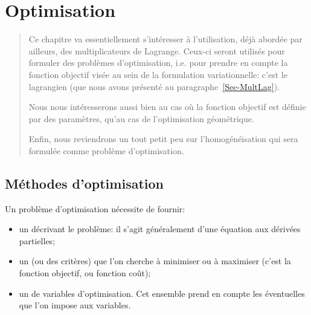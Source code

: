 \chapter{Optimisation}\label{Ch-Optim}
\begin{abstract}
Ce chapitre va essentiellement s'intéresser à l'utilisation, déjà abordée par ailleurs, des multiplicateurs de Lagrange. Ceux-ci seront utilisés pour formuler des problèmes d'optimisation, i.e. pour prendre en compte la fonction objectif visée au sein de la formulation variationnelle: c'est le lagrangien (que nous avons présenté au paragraphe~\ref{Sec-MultLag}).

Nous nous intéresserons aussi bien au cas où la fonction objectif est définie par des paramètres, qu'au cas de l'optimisation géométrique.

Enfin, nous reviendrons un tout petit peu sur l'homogénéisation qui sera formulée comme problème d'optimisation.
\end{abstract}

\medskip
\section{Méthodes d'optimisation}

Un problème d'optimisation nécessite de fournir:
\begin{itemize}
   \item un  décrivant le problème: il s'agit généralement d'une équation aux dérivées partielles;
   \item un  (ou des critères) que l'on cherche à minimiser ou à maximiser (c'est la fonction objectif, ou fonction coût);
   \item un  de variables d'optimisation. Cet ensemble prend en compte les éventuelles  que l'on impose aux variables.
\end{itemize}


